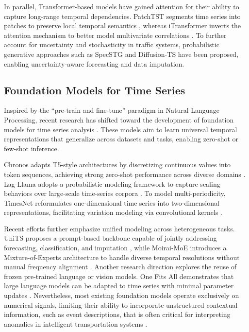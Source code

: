 \documentclass{article}
\begin{document}
In parallel, Transformer-based models have gained attention for their ability to capture long-range temporal dependencies. PatchTST segments time series into patches to preserve local temporal semantics \cite{nie_time_2023}, whereas iTransformer inverts the attention mechanism to better model multivariate correlations \cite{liu_itransformer_2023}. To further account for uncertainty and stochasticity in traffic systems, probabilistic generative approaches such as SpecSTG \cite{lin_specstg_2024} and Diffusion-TS \cite{yuan_diffusion-ts_2023} have been proposed, enabling uncertainty-aware forecasting and data imputation.

\subsection{Foundation Models for Time Series}
Inspired by the ``pre-train and fine-tune'' paradigm in Natural Language Processing, recent research has shifted toward the development of foundation models for time series analysis \cite{liang_foundation_2024, jin_large_2023}. These models aim to learn universal temporal representations that generalize across datasets and tasks, enabling zero-shot or few-shot inference.

Chronos adapts T5-style architectures by discretizing continuous values into token sequences, achieving strong zero-shot performance across diverse domains \cite{ansari_chronos_2024}. Lag-Llama adopts a probabilistic modeling framework to capture scaling behaviors over large-scale time-series corpora \cite{rasul_lag-llama_2023}. To model multi-periodicity, TimesNet reformulates one-dimensional time series into two-dimensional representations, facilitating variation modeling via convolutional kernels \cite{wu_timesnet_2023}.

Recent efforts further emphasize unified modeling across heterogeneous tasks. UniTS proposes a prompt-based backbone capable of jointly addressing forecasting, classification, and imputation \cite{gao_units_2024}, while Moirai-MoE introduces a Mixture-of-Experts architecture to handle diverse temporal resolutions without manual frequency alignment \cite{liu_moirai-moe_2024}. Another research direction explores the reuse of frozen pre-trained language or vision models. One Fits All demonstrates that large language models can be adapted to time series with minimal parameter updates \cite{zhou_one_2023}. Nevertheless, most existing foundation models operate exclusively on numerical signals, limiting their ability to incorporate unstructured contextual information, such as event descriptions, that is often critical for interpreting anomalies in intelligent transportation systems \cite{jin_time_2024}.
\end{document}
